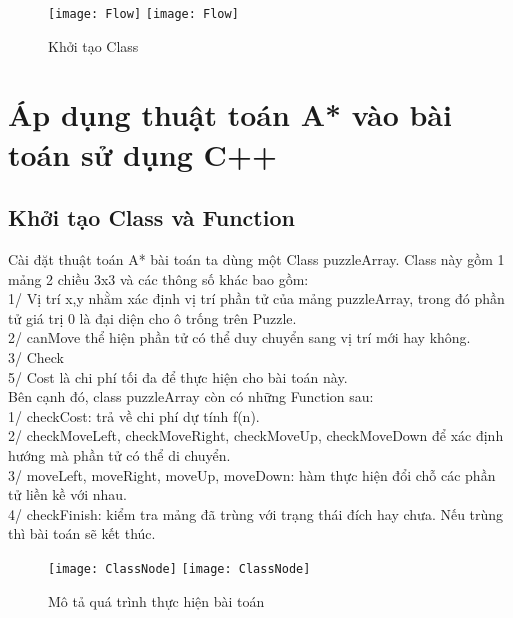 \begin{figure}[!htbp]
  \begin{center}
    \leavevmode
    \ifpdf
      \texttt{[image: Flow]}
    \else
      \texttt{[image: Flow]}
    \fi
    \caption{Khởi tạo Class}
    \label{FigAir}
   
  \end{center}
\end{figure}
\FloatBarrier



\section{Áp dụng thuật toán A* vào bài toán sử dụng C++}
\subsection{Khởi tạo Class và Function}
Cài đặt thuật toán A* bài toán ta dùng một Class puzzleArray. Class này gồm 1 mảng 2 chiều 3x3 và các thông số khác bao gồm: \\
1/ Vị trí x,y nhằm xác định vị trí phần tử của mảng puzzleArray, trong đó phần tử giá trị 0 là đại diện cho ô trống trên Puzzle.\\
2/ canMove thể hiện phần tử có thể duy chuyển sang vị trí mới hay không.\\
3/ Check \\
5/ Cost là chi phí tối đa để thực hiện cho bài toán này.\\
Bên cạnh đó, class puzzleArray còn có những Function sau:\\
1/ checkCost: trả về chi phí dự tính f(n).\\
2/ checkMoveLeft, checkMoveRight, checkMoveUp, checkMoveDown để xác định hướng mà phần tử có thể di chuyển.\\
3/ moveLeft, moveRight, moveUp, moveDown: hàm thực hiện đổi chỗ các phần tử liền kề với nhau.\\
4/ checkFinish: kiểm tra mảng đã trùng với trạng thái đích hay chưa. Nếu trùng thì bài toán sẽ kết thúc.
\begin{figure}[!htbp]
  \begin{center}
    \leavevmode
    \ifpdf
      \texttt{[image: ClassNode]}
    \else
      \texttt{[image: ClassNode]}
    \fi
    \caption{Mô tả quá trình thực hiện bài toán}
    \label{FigAir}
   
  \end{center}
\end{figure}
\FloatBarrier

